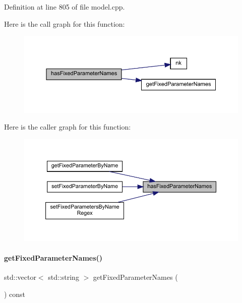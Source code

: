 Definition at line 805 of file model.\+cpp.

Here is the call graph for this function\+:
\nopagebreak
\begin{figure}[H]
\begin{center}
\leavevmode
\includegraphics[width=350pt]{classamici_1_1_model_adfe23b552732bba8d8f54298522abf3c_cgraph}
\end{center}
\end{figure}
Here is the caller graph for this function\+:
\nopagebreak
\begin{figure}[H]
\begin{center}
\leavevmode
\includegraphics[width=350pt]{classamici_1_1_model_adfe23b552732bba8d8f54298522abf3c_icgraph}
\end{center}
\end{figure}
\mbox{\label{classamici_1_1_model_abdfc1bad63f4c3b927aac8c3422d639a}} 
\paragraph{\texorpdfstring{getFixedParameterNames()}{getFixedParameterNames()}}
{\footnotesize\ttfamily std\+::vector$<$ std\+::string $>$ get\+Fixed\+Parameter\+Names (\begin{DoxyParamCaption}{ }\end{DoxyParamCaption}) const\hspace{0.3cm}{\ttfamily [virtual]}}

